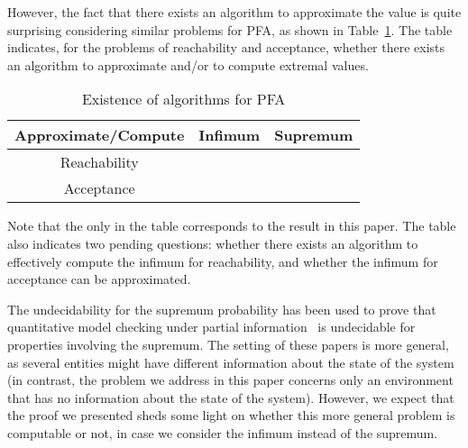 \documentclass[final,3p,times,twocolumn]{elsarticle}
\theoremstyle{plain}
\theoremstyle{definition}
\newcommand{\recallTable}[1]{Table~\ref{#1}}
\begin{document}
However, the fact that there exists an algorithm to approximate the value is
quite surprising considering similar problems for PFA, as shown in
\recallTable{tab:decidability}. The table indicates, for the problems of
reachability and acceptance, whether there exists an
algorithm to approximate and/or to compute extremal values.
\begin{table}
\centering
\footnotesize
\begin{tabular}{|c|c|c|}
\hline
Approximate/Compute &  Infimum & Supremum \cite{DBLP:journals/ai/MadaniHC03} \\
\hline
Reachability 		&		& 
									\\
\hline
Acceptance	\cite{DBLP:journals/mst/BlondelC03} & 
												&    \\
\hline
\end{tabular}
\caption{\label{tab:decidability}Existence of algorithms for PFA}
\end{table}
Note that the only  in the table corresponds to the result in this
paper. The table also indicates two pending questions: whether there exists
an algorithm to effectively compute the infimum for reachability, and whether
the infimum for acceptance can be approximated.

The undecidability for the supremum probability has been used to prove that
quantitative model checking under partial
information~\cite{DBLP:conf/formats/GiroD07,DBLP:conf/sbmf/Giro09} is
undecidable for properties involving the supremum. The setting of these papers
is more general, as several entities might have different information about the
state of the system (in contrast, the problem we address in this paper concerns
only an environment that has no information about the state of the system).
However, we expect that the proof we presented sheds some light on whether this
more general problem is computable or not, in case we consider the infimum
instead of the supremum.



\end{document}
